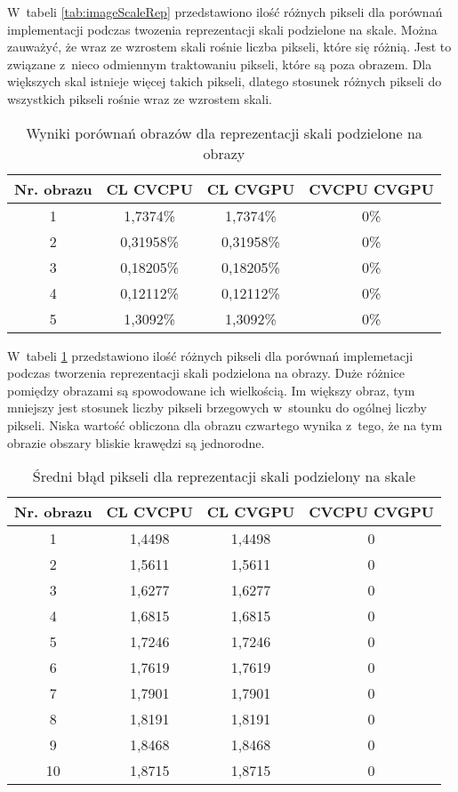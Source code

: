 W~tabeli \ref{tab:imageScaleRep} przedstawiono ilość różnych pikseli dla porównań implementacji podczas twozenia reprezentacji skali podzielone na skale. Można zauważyć, że wraz ze wzrostem skali rośnie liczba pikseli, które się różnią. Jest to związane z~nieco odmiennym traktowaniu pikseli, które są poza obrazem. Dla większych skal istnieje więcej takich pikseli, dlatego stosunek różnych pikseli do wszystkich pikseli rośnie wraz ze wzrostem skali.

\begin{table}
\caption{Wyniki porównań obrazów dla reprezentacji skali podzielone na obrazy}
\label{tab:imageImageRep}
\begin{tabular}{|c|c|c|c|}
\hline
Nr. obrazu & CL \- CVCPU & CL \- CVGPU & CVCPU \- CVGPU \\ \hline
1 & 1,7374\% & 1,7374\% & 0\% \\ \hline
2 & 0,31958\% & 0,31958\% & 0\% \\ \hline
3 & 0,18205\% & 0,18205\% & 0\% \\ \hline
4 & 0,12112\% & 0,12112\% & 0\% \\ \hline
5 & 1,3092\% & 1,3092\% & 0\% \\ \hline
\end{tabular}
\end{table}

W~tabeli \ref{tab:imageImageRep} przedstawiono ilość różnych pikseli dla porównań implemetacji podczas tworzenia reprezentacji skali podzielona na obrazy. Duże różnice pomiędzy obrazami są spowodowane ich wielkością. Im większy obraz, tym mniejszy jest stosunek liczby pikseli brzegowych w~stounku do ogólnej liczby pikseli. Niska wartość obliczona dla obrazu czwartego wynika z~tego, że na tym obrazie obszary bliskie krawędzi są jednorodne.

\begin{table}
\caption{Średni błąd pikseli dla reprezentacji skali podzielony na skale}
\label{tab:devScaleRep}
\begin{tabular}{|c|c|c|c|}
\hline
Nr. obrazu & CL \- CVCPU & CL \- CVGPU & CVCPU \- CVGPU \\ \hline
1 & 1,4498 & 1,4498 & 0 \\ \hline
2 & 1,5611 & 1,5611 & 0 \\ \hline
3 & 1,6277 & 1,6277 & 0 \\ \hline
4 & 1,6815 & 1,6815 & 0 \\ \hline
5 & 1,7246 & 1,7246 & 0 \\ \hline
6 & 1,7619 & 1,7619 & 0 \\ \hline
7 & 1,7901 & 1,7901 & 0 \\ \hline
8 & 1,8191 & 1,8191 & 0 \\ \hline
9 & 1,8468 & 1,8468 & 0 \\ \hline
10 & 1,8715 & 1,8715 & 0 \\ \hline
\end{tabular}
\end{table}

